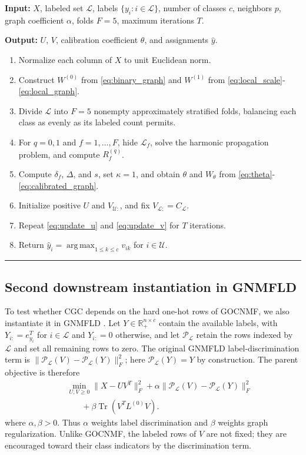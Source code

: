 \documentclass[11pt]{article}
\theoremstyle{remark}
\newcommand{\R}{\mathbb{R}}
\newcommand{\Tr}{\operatorname{Tr}}
\newcommand{\argmaxop}{\operatorname*{arg\,max}}
\begin{document}
\noindent\textbf{Input:} $X$, labeled set $\mathcal L$, labels $\{y_i:i\in\mathcal L\}$, number of classes $c$, neighbors $p$, graph coefficient $\alpha$, folds $F=5$, maximum iterations $T$.

\noindent\textbf{Output:} $U$, $V$, calibration coefficient $\theta$, and assignments $\widehat y$.

\begin{enumerate}[leftmargin=2em]
\item Normalize each column of $X$ to unit Euclidean norm.
\item Construct $W^{(0)}$ from \eqref{eq:binary_graph} and $W^{(1)}$ from \eqref{eq:local_scale}-\eqref{eq:local_graph}.
\item Divide $\mathcal L$ into $F=5$ nonempty approximately stratified folds, balancing each class as evenly as its labeled count permits.
\item For $q=0,1$ and $f=1,\ldots,F$, hide $\mathcal L_f$, solve the harmonic propagation problem, and compute $R_f^{(q)}$.
\item Compute $\delta_f$, $\Delta$, and $s$, set $\kappa=1$, and obtain $\theta$ and $W_{\theta}$ from \eqref{eq:theta}-\eqref{eq:calibrated_graph}.
\item Initialize positive $U$ and $V_{\mathcal U:}$, and fix $V_{\mathcal L:}=C_{\mathcal L}$.
\item Repeat \eqref{eq:update_u} and \eqref{eq:update_v} for $T$ iterations.
\item Return $\widehat y_i=\argmaxop_{1\le k\le c}v_{ik}$ for $i\in\mathcal U$.
\end{enumerate}

\noindent\rule{\linewidth}{0.4pt}

\subsection{Second downstream instantiation in GNMFLD}
\label{subsec:gnmfld_instantiation}

To test whether CGC depends on the hard one-hot rows of GOCNMF, we also instantiate it in GNMFLD \cite{Xing2021GNMFLD}. Let $Y\in\R_{+}^{n\times c}$ contain the available labels, with $Y_{i:}=e_{y_i}^{T}$ for $i\in\mathcal L$ and $Y_{i:}=0$ otherwise, and let $\mathcal P_{\mathcal L}$ retain the rows indexed by $\mathcal L$ and set all remaining rows to zero. The original GNMFLD label-discrimination term is $\|\mathcal P_{\mathcal L}(V)-\mathcal P_{\mathcal L}(Y)\|_F^2$; here $\mathcal P_{\mathcal L}(Y)=Y$ by construction. The parent objective is therefore
\begin{eqnarray}
&&\min_{U,V\ge0}
\|X-UV^{T}\|_{F}^{2}
+\alpha\|\mathcal P_{\mathcal L}(V)-\mathcal P_{\mathcal L}(Y)\|_{F}^{2}\nonumber\\
&&~~~~~~~~+\beta\Tr(V^{T}L^{(0)}V).\label{eq:gnmfld_parent}
\end{eqnarray}
where $\alpha,\beta>0$. Thus $\alpha$ weights label discrimination and $\beta$ weights graph regularization. Unlike GOCNMF, the labeled rows of $V$ are not fixed; they are encouraged toward their class indicators by the discrimination term.
\end{document}
